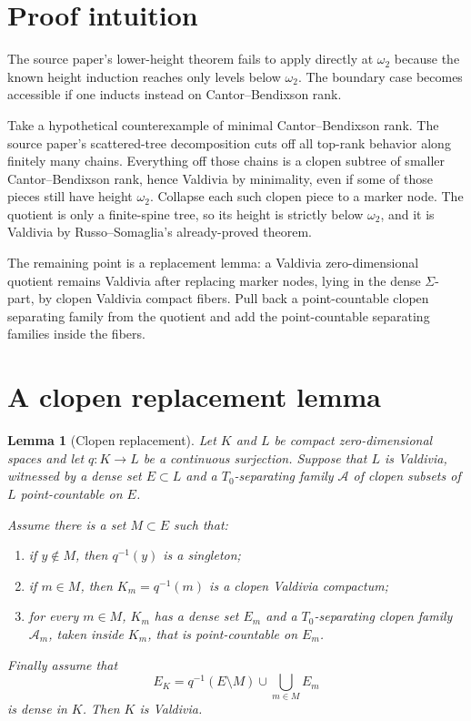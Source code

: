 \documentclass[11pt]{article}
\newtheorem{lemma}{Lemma}
\begin{document}
\section*{Proof intuition}

The source paper's lower-height theorem fails to apply directly at
\(\omega_2\) because the known height induction reaches only levels below
\(\omega_2\).  The boundary case becomes accessible if one inducts instead on
Cantor--Bendixson rank.

Take a hypothetical counterexample of minimal Cantor--Bendixson rank.  The
source paper's scattered-tree decomposition cuts off all top-rank behavior
along finitely many chains.  Everything off those chains is a clopen subtree
of smaller Cantor--Bendixson rank, hence Valdivia by minimality, even if some
of those pieces still have height \(\omega_2\).  Collapse each such clopen
piece to a marker node.  The quotient is only a finite-spine tree, so its
height is strictly below \(\omega_2\), and it is Valdivia by Russo--Somaglia's
already-proved theorem.

The remaining point is a replacement lemma: a Valdivia zero-dimensional
quotient remains Valdivia after replacing marker nodes, lying in the dense
\(\Sigma\)-part, by clopen Valdivia compact fibers.  Pull back a
point-countable clopen separating family from the quotient and add the
point-countable separating families inside the fibers.

\section*{A clopen replacement lemma}

\begin{lemma}[Clopen replacement]\label{lem:replacement}
Let \(K\) and \(L\) be compact zero-dimensional spaces and let
\(q:K\to L\) be a continuous surjection.  Suppose that \(L\) is Valdivia,
witnessed by a dense set \(E\subset L\) and a \(T_0\)-separating family
\(\mathcal A\) of clopen subsets of \(L\) point-countable on \(E\).

Assume there is a set \(M\subset E\) such that:
\begin{enumerate}
\item if \(y\notin M\), then \(q^{-1}(y)\) is a singleton;
\item if \(m\in M\), then \(K_m=q^{-1}(m)\) is a clopen Valdivia compactum;
\item for every \(m\in M\), \(K_m\) has a dense set \(E_m\) and a
\(T_0\)-separating clopen family \(\mathcal A_m\), taken inside \(K_m\), that
is point-countable on \(E_m\).
\end{enumerate}
Finally assume that
\[
E_K=q^{-1}(E\setminus M)\cup\bigcup_{m\in M}E_m
\]
is dense in \(K\).
Then \(K\) is Valdivia.
\end{lemma}
\end{document}
